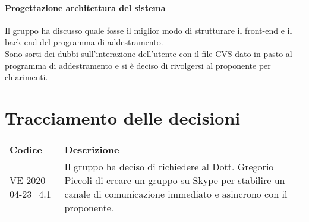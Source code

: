 \documentclass{article}
\begin{document}
\paragraph*{Progettazione architettura del sistema}
Il gruppo ha discusso quale fosse il miglior modo di strutturare il front-end e il back-end del programma di addestramento. \\
Sono sorti dei dubbi sull'interazione dell'utente con il file CVS dato in pasto al programma di addestramento e si è deciso di rivolgersi al proponente per chiarimenti.


\section{Tracciamento delle decisioni}
\begin{table}[H]
  \centering
  \begin{tabular}{p{4cm}|p{12cm}}
    \rowcolor{lightgray}
    \textbf{Codice}  & \textbf{Descrizione}      \\
     VE-2020-04-23\_4.1 & Il gruppo ha deciso di richiedere al Dott. Gregorio Piccoli di creare un gruppo su Skype per stabilire un canale di comunicazione immediato e asincrono con il proponente. \\
  \end{tabular}
\end{table}
\end{document}
